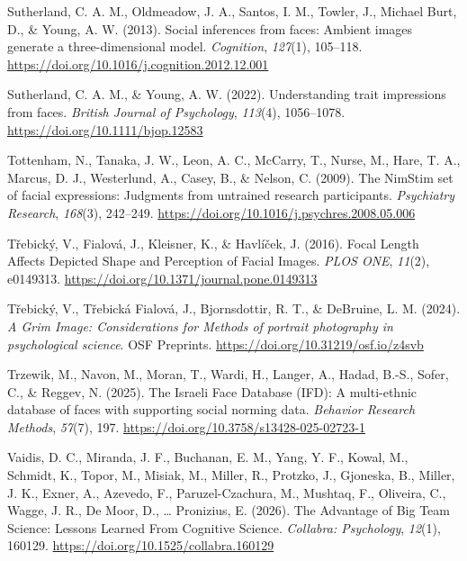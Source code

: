 \documentclass[
  letterpaper,
  DIV=11,
  numbers=noendperiod]{scrartcl}
\newlength{\cslhangindent}
\newenvironment{CSLReferences}[2] %
 {\begin{list}{}{%
  \setlength{\itemindent}{0pt}
  \setlength{\leftmargin}{0pt}
  \setlength{\parsep}{0pt}
  \ifodd #1
   \setlength{\leftmargin}{\cslhangindent}
   \setlength{\itemindent}{-1\cslhangindent}
  \fi
  \setlength{\itemsep}{#2\baselineskip}}}
 {\end{list}}
\begin{document}
\begin{CSLReferences}{1}{0}
Sutherland, C. A. M., Oldmeadow, J. A., Santos, I. M., Towler, J.,
Michael Burt, D., \& Young, A. W. (2013). Social inferences from faces:
{Ambient} images generate a three-dimensional model. \emph{Cognition},
\emph{127}(1), 105--118.
\url{https://doi.org/10.1016/j.cognition.2012.12.001}

Sutherland, C. A. M., \& Young, A. W. (2022). Understanding trait
impressions from faces. \emph{British Journal of Psychology},
\emph{113}(4), 1056--1078. \url{https://doi.org/10.1111/bjop.12583}

Tottenham, N., Tanaka, J. W., Leon, A. C., McCarry, T., Nurse, M., Hare,
T. A., Marcus, D. J., Westerlund, A., Casey, B., \& Nelson, C. (2009).
The {NimStim} set of facial expressions: {Judgments} from untrained
research participants. \emph{Psychiatry Research}, \emph{168}(3),
242--249. \url{https://doi.org/10.1016/j.psychres.2008.05.006}

Třebický, V., Fialová, J., Kleisner, K., \& Havlíček, J. (2016). Focal
{Length} {Affects} {Depicted} {Shape} and {Perception} of {Facial}
{Images}. \emph{PLOS ONE}, \emph{11}(2), e0149313.
\url{https://doi.org/10.1371/journal.pone.0149313}

Třebický, V., Třebická Fialová, J., Bjornsdottir, R. T., \& DeBruine, L.
M. (2024). \emph{A {Grim} {Image}: {Considerations} for {Methods} of
portrait photography in psychological science}. OSF Preprints.
\url{https://doi.org/10.31219/osf.io/z4svb}

Trzewik, M., Navon, M., Moran, T., Wardi, H., Langer, A., Hadad, B.-S.,
Sofer, C., \& Reggev, N. (2025). The {Israeli} {Face} {Database}
({IFD}): {A} multi-ethnic database of faces with supporting social
norming data. \emph{Behavior Research Methods}, \emph{57}(7), 197.
\url{https://doi.org/10.3758/s13428-025-02723-1}

Vaidis, D. C., Miranda, J. F., Buchanan, E. M., Yang, Y. F., Kowal, M.,
Schmidt, K., Topor, M., Misiak, M., Miller, R., Protzko, J., Gjoneska,
B., Miller, J. K., Exner, A., Azevedo, F., Paruzel-Czachura, M.,
Mushtaq, F., Oliveira, C., Wagge, J. R., De Moor, D., \ldots{}
Pronizius, E. (2026). The {Advantage} of {Big} {Team} {Science}:
{Lessons} {Learned} {From} {Cognitive} {Science}. \emph{Collabra:
Psychology}, \emph{12}(1), 160129.
\url{https://doi.org/10.1525/collabra.160129}


\end{CSLReferences}
\end{document}
